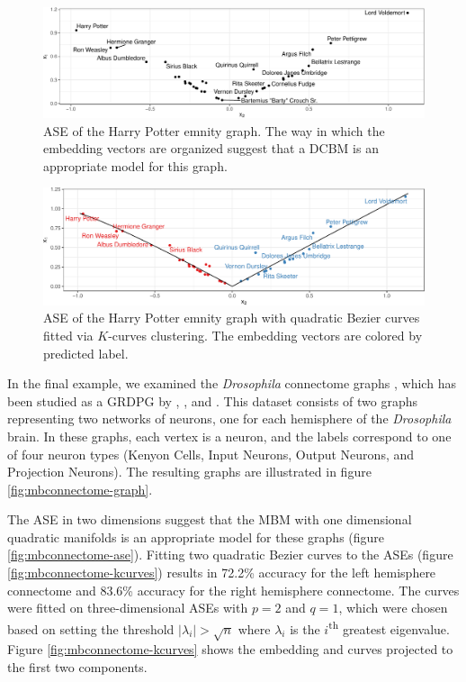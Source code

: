 \documentclass[
  12pt,
]{article}
\theoremstyle{definition}
\theoremstyle{definition}
\theoremstyle{definition}
\theoremstyle{definition}
\theoremstyle{remark}
\begin{document}
\begin{figure}[H]

{\centering \includegraphics{draft_files/figure-latex/hp-ase-1} 

}

\caption{ASE of the Harry Potter emnity graph. The way in which the embedding vectors are organized suggest that a DCBM is an appropriate model for this graph.}\label{fig:hp-ase}
\end{figure}

\begin{figure}[H]

{\centering \includegraphics{draft_files/figure-latex/hp-kcurves-1} 

}

\caption{ASE of the Harry Potter emnity graph with quadratic Bezier curves fitted via $K$-curves clustering. The embedding vectors are colored by predicted label.}\label{fig:hp-kcurves}
\end{figure}

In the final example, we examined the \emph{Drosophila} connectome graphs \citep{Eichler141762}, which has been studied as a GRDPG by \citet{athreya2017statistical}, \citet{https://doi.org/10.48550/arxiv.1705.03297}, and \citet{SannaPassino2022}.
This dataset consists of two graphs representing two networks of neurons, one for each hemisphere of the \emph{Drosophila} brain.
In these graphs, each vertex is a neuron, and the labels correspond to one of four neuron types (Kenyon Cells, Input Neurons, Output Neurons, and Projection Neurons).
The resulting graphs are illustrated in figure \ref{fig:mbconnectome-graph}.

The ASE in two dimensions suggest that the MBM with one dimensional quadratic manifolds is an appropriate model for these graphs (figure \ref{fig:mbconnectome-ase}).
Fitting two quadratic Bezier curves to the ASEs (figure \ref{fig:mbconnectome-kcurves}) results in 72.2\% accuracy for the left hemisphere connectome and 83.6\% accuracy for the right hemisphere connectome.
The curves were fitted on three-dimensional ASEs with \(p = 2\) and \(q = 1\), which were chosen based on setting the threshold \(|\lambda_i| > \sqrt{n}\) where \(\lambda_i\) is the \(i\)\textsuperscript{th} greatest eigenvalue.
Figure \ref{fig:mbconnectome-kcurves} shows the embedding and curves projected to the first two components.
\end{document}
